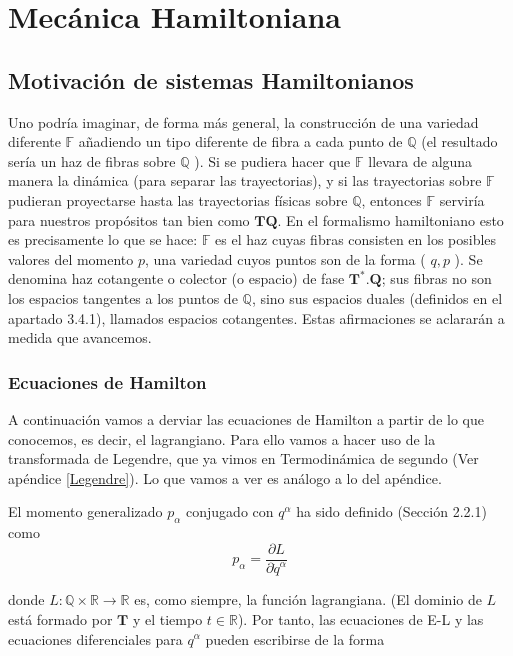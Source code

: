 \setchapterpreamble[u]{\margintoc}
\chapter{Mecánica Hamiltoniana}


\section{Motivación de sistemas Hamiltonianos}

Uno podría imaginar, de forma más general, la construcción de una variedad diferente $\mathbb{F}$ añadiendo un tipo diferente de fibra a cada punto de $\mathbb{Q}$ (el resultado sería un haz de fibras sobre $\mathbb{Q}$ ). Si se pudiera hacer que $\mathbb{F}$ llevara de alguna manera la dinámica (para separar las trayectorias), y si las trayectorias sobre $\mathbb{F}$ pudieran proyectarse hasta las trayectorias físicas sobre $\mathbb{Q}$, entonces $\mathbb{F}$ serviría para nuestros propósitos tan bien como $\mathbf{TQ}$. En el formalismo hamiltoniano esto es precisamente lo que se hace: $\mathbb{F}$ es el haz cuyas fibras consisten en los posibles valores del momento $p$, una variedad cuyos puntos son de la forma ( $q, p$ ). Se denomina haz cotangente o colector (o espacio) de fase $\mathbf{T}^{*}. \mathbf{Q}$; sus fibras no son los espacios tangentes a los puntos de $\mathbb{Q}$, sino sus espacios duales (definidos en el apartado 3.4.1), llamados espacios cotangentes. Estas afirmaciones se aclararán a medida que avancemos.

\subsection{Ecuaciones de Hamilton}

A continuación vamos a derviar las ecuaciones de Hamilton a partir de lo que conocemos, es decir, el lagrangiano. Para ello vamos a hacer uso de la transformada de Legendre, que ya vimos en Termodinámica de segundo (Ver apéndice \ref{Legendre}). Lo que vamos a ver es análogo a lo del apéndice. 

El momento generalizado $p_{\alpha}$ conjugado con $q^{\alpha}$ ha sido definido (Sección 2.2.1) como
\begin{equation*}
  p_{\alpha}=\frac{\partial L}{\partial \dot{q}^{\alpha}} \tag{5.1}
\end{equation*}

donde $L: \mathbb{Q} \times \mathbb{R} \rightarrow \mathbb{R}$ es, como siempre, la función lagrangiana. (El dominio de $L$ está formado por $\mathbf{T}$ y el tiempo $t \in \mathbb{R}$). Por tanto, las ecuaciones de E-L y las ecuaciones diferenciales para $q^{\alpha}$ pueden escribirse de la forma


